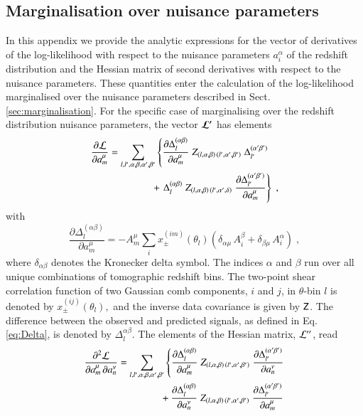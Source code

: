 \documentclass{aa}
\newcommand{\eq}[1]{\begin{equation}  #1 \end{equation}}
\newcommand{\eqa}[1]{\begin{align}   #1 \end{align}}
\newcommand{\br}[1]{\left( #1 \right)}
\newcommand{\nn}{\nonumber}
\begin{document}
\begin{appendix} 
\section{Marginalisation over nuisance parameters}
\label{ap:derivatives}
In this appendix we provide the analytic expressions for the vector of derivatives of the log-likelihood with respect to the nuisance parameters $a_i^\alpha$ of the redshift distribution and the Hessian matrix of second derivatives with respect to the nuisance parameters. These quantities enter the calculation of the log-likelihood marginalised over the nuisance parameters described in Sect. \ref{sec:marginalisation}.
For the specific case of marginalising over the redshift distribution nuisance parameters, the vector $\boldsymbol{\cal L^\prime}$ has elements
\eqa{
\frac{\partial {\cal L}}{\partial a_m^\mu} &= \sum_{l,l',\alpha,\beta,\alpha',\beta'}  \left\{ \frac{\partial \Delta_l^{(\alpha \beta)}}{\partial a_m^\mu}\; Z_{(l,\alpha,\beta) \,  (l',\alpha',\beta')}\; \Delta_{l'}^{(\alpha' \beta')} \right. \\ \nn
& \hspace*{1.5cm} + \left. \Delta_l^{(\alpha \beta)}\; Z_{(l,\alpha,\beta) \,  (l',\alpha',\delta)}\; \frac{\partial \Delta_{l'}^{(\alpha' \beta')}}{\partial a_m^\mu} \right\}\;,
}
with
\eq{
\frac{\partial \Delta_l^{(\alpha \beta)}}{\partial a_m^\mu} = - A_m^\mu \sum_i x_\pm^{(im)}(\theta_l) \br{\delta_{\alpha \mu}\, A_i^\beta + \delta_{\beta \mu}\, A_i^\alpha}\;,
}
where $\delta_{\alpha \beta}$ denotes the Kronecker delta symbol. The indices $\alpha$ and $\beta$ run over all unique combinations of tomographic redshift bins. The two-point shear correlation function of two Gaussian comb components, $i$ and $j$, in $\theta$-bin $l$ is denoted by $x_\pm^{(ij)}(\theta_l),$ and the inverse data covariance is given by $\mathsf{Z}$. The difference between the observed and predicted signals, as defined in Eq. \eqref{eq:Delta}, is denoted by $\Delta_l^{\alpha\beta}$.
The elements of the Hessian matrix, ${\cal L^{\prime\prime}}$, read
\eqa{
\label{eq:hessian}
\frac{\partial^2 {\cal L}}{\partial a_m^\mu\, \partial a_n^\nu} &= \sum_{l,l',\alpha,\beta,\alpha',\beta'} 
\left\{ 
\frac{\partial \Delta_l^{(\alpha \beta)}}{\partial a_m^\mu}\; Z_{(l,\alpha,\beta) \,  (l',\alpha',\beta')}\; \frac{\partial \Delta_{l'}^{(\alpha' \beta')}}{\partial a_n^\nu}  \right. \\ \nn
&\hspace*{1.5cm}+ \frac{\partial \Delta_l^{(\alpha \beta)}}{\partial a_n^\nu}\; Z_{(l,\alpha,\beta) \,  (l',\alpha',\beta')}\; \frac{\partial \Delta_{l'}^{(\alpha' \beta')}}{\partial a_m^\mu} \\ \nn
}
\end{appendix}
\end{document}
